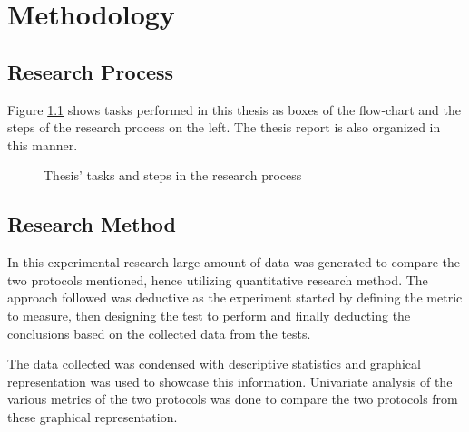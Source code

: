 \chapter{Methodology}

\section{Research Process}

Figure \ref{RePrSteps} shows tasks performed in this thesis as boxes of the flow-chart and the steps of the research process on the left. The thesis report is also organized in this manner.

\begin{figure}[h]
\centering
\def\svgwidth{0.93\columnwidth}

\vspace{-10pt}
\caption{Thesis' tasks and steps in the research process}
\label{RePrSteps}
\end{figure}

\section{Research Method}

In this experimental research large amount of data was generated to compare the two protocols mentioned, hence utilizing quantitative research method. The approach followed was deductive as the experiment started by defining the metric to measure, then designing the test to perform and finally deducting the conclusions based on the collected data from the tests.

The data collected was condensed with descriptive statistics and graphical representation was used to showcase this information. Univariate analysis  of the various metrics of the two protocols was done to compare the two protocols from these graphical representation.